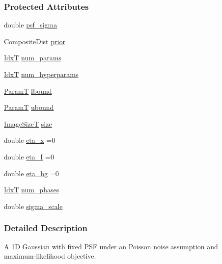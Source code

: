 \subsubsection*{Protected Attributes}
\begin{DoxyCompactItemize}
\item 
double \hyperlink{classmappel_1_1Gauss1DModel_a62c6b2a5d8ab5f5596504a19daed66b2}{psf\+\_\+sigma}
\item 
Composite\+Dist \hyperlink{classmappel_1_1PointEmitterModel_a393839f8eb1dd3d61c9369377742ba0e}{prior}
\item 
\hyperlink{namespacemappel_ab17ec0f30b61ece292439d7ece81d3a8}{IdxT} \hyperlink{classmappel_1_1PointEmitterModel_a9af0484391bd6021ddc04ac666ab49ad}{num\+\_\+params}
\item 
\hyperlink{namespacemappel_ab17ec0f30b61ece292439d7ece81d3a8}{IdxT} \hyperlink{classmappel_1_1PointEmitterModel_ab2423214fdd81c8212118770b5b17b1f}{num\+\_\+hyperparams}
\item 
\hyperlink{classmappel_1_1PointEmitterModel_a665ec6aea3aac139bb69a23c06d4b9a1}{ParamT} \hyperlink{classmappel_1_1PointEmitterModel_a889bc82f74cfa654da121e5770296ab2}{lbound}
\item 
\hyperlink{classmappel_1_1PointEmitterModel_a665ec6aea3aac139bb69a23c06d4b9a1}{ParamT} \hyperlink{classmappel_1_1PointEmitterModel_a35b883e84b6a2e0093bdf482c623beef}{ubound}
\item 
\hyperlink{classmappel_1_1ImageFormat1DBase_a6456bab2b26702022ee32ae19e90dcac}{Image\+SizeT} \hyperlink{classmappel_1_1ImageFormat1DBase_a8941b4d028e4dd881146a7c1b9039bb1}{size}
\item 
double \hyperlink{classmappel_1_1MCMCAdaptor1D_ae5787e38c9cef6168acf6fc5d3216693}{eta\+\_\+x} =0
\item 
double \hyperlink{classmappel_1_1MCMCAdaptor1D_a5780d326be0c40e10d6c91777cfffbd3}{eta\+\_\+I} =0
\item 
double \hyperlink{classmappel_1_1MCMCAdaptor1D_af54c93421b8e298289cbb92743c6b3d5}{eta\+\_\+bg} =0
\item 
\hyperlink{namespacemappel_ab17ec0f30b61ece292439d7ece81d3a8}{IdxT} \hyperlink{classmappel_1_1MCMCAdaptorBase_a44b90a984ace712584074dc17831fe25}{num\+\_\+phases}
\item 
double \hyperlink{classmappel_1_1MCMCAdaptorBase_a76312f7d589bf3f3e754beca174b884b}{sigma\+\_\+scale}
\end{DoxyCompactItemize}


\subsubsection{Detailed Description}
A 1D Gaussian with fixed P\+SF under an Poisson noise assumption and maximum-\/likelihood objective. 

